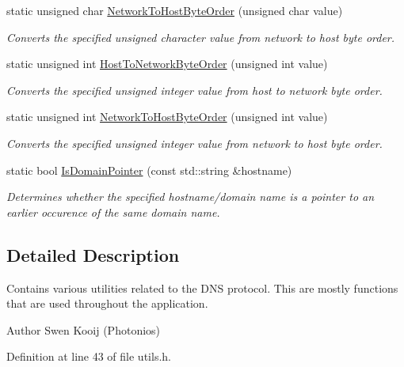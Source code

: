 \begin{DoxyCompactItemize}
static unsigned char \hyperlink{class_senergy_1_1_dns_1_1_utils_ac34288e7acfa54f6faaa775ab5654192}{Network\-To\-Host\-Byte\-Order} (unsigned char value)
\begin{DoxyCompactList}\small\item\em Converts the specified unsigned character value from network to host byte order. \end{DoxyCompactList}\item 
static unsigned int \hyperlink{class_senergy_1_1_dns_1_1_utils_a7a521aadbb12776e2127abe8028411dc}{Host\-To\-Network\-Byte\-Order} (unsigned int value)
\begin{DoxyCompactList}\small\item\em Converts the specified unsigned integer value from host to network byte order. \end{DoxyCompactList}\item 
static unsigned int \hyperlink{class_senergy_1_1_dns_1_1_utils_ad4711275abcbc1d332f3c0208e74c4b8}{Network\-To\-Host\-Byte\-Order} (unsigned int value)
\begin{DoxyCompactList}\small\item\em Converts the specified unsigned integer value from network to host byte order. \end{DoxyCompactList}\item 
static bool \hyperlink{class_senergy_1_1_dns_1_1_utils_a96aa042aaec1c2608a13a6ba83792336}{Is\-Domain\-Pointer} (const std\-::string \&hostname)
\begin{DoxyCompactList}\small\item\em Determines whether the specified hostname/domain name is a pointer to an earlier occurence of the same domain name. \end{DoxyCompactList}\end{DoxyCompactItemize}


\subsection{Detailed Description}
Contains various utilities related to the D\-N\-S protocol. This are mostly functions that are used throughout the application. 

\begin{DoxyAuthor}{Author}
Swen Kooij (Photonios) 
\end{DoxyAuthor}


Definition at line 43 of file utils.\-h.



